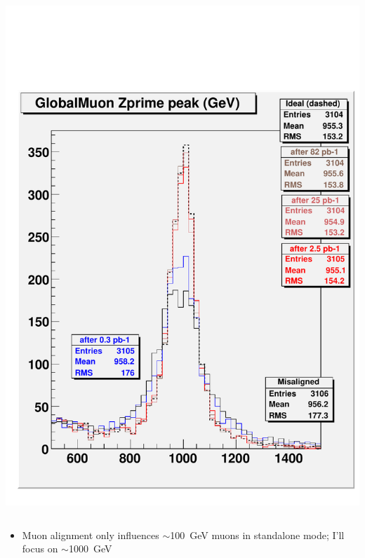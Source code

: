 \documentclass[compress]{beamer}
\begin{document}
\begin{frame}
\begin{columns}
\begin{center}
\includegraphics[width=0.9\linewidth]{checkit_globZprime.pdf}
\end{center}
\end{columns}

\vspace{0.25 cm}
\begin{itemize}
\item Muon alignment only influences $\sim$100~GeV muons in standalone mode; I'll focus on $\sim$1000~GeV
\end{itemize}
\vspace{-0.25 cm}
\mbox{ }

\end{frame}
\end{document}
